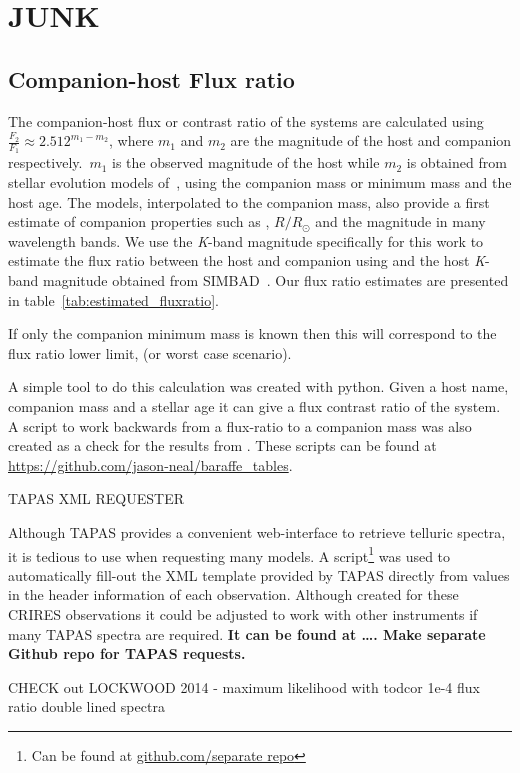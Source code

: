 

\section{JUNK}



\subsection{Companion-host Flux ratio}
The companion-host flux or contrast ratio of the systems are calculated using \(\frac{F_{2}}{F_{1}} \approx 2.512^{m_1-m_2}\), where \(m_1\) and \(m_2\) are the magnitude of the host and companion respectively.\ \(m_1\) is the observed magnitude of the host while \(m_2\) is obtained from stellar evolution models of~\citet{baraffe_evolutionary_2003, baraffe_new_2015}, using the companion mass or minimum mass and the host age. The models, interpolated to the companion mass, also provide a first estimate of companion properties such as \teff{}, \(R/R_{\odot}\) and the magnitude in many wavelength bands.
We use the \emph{K}-band magnitude specifically for this work to estimate the flux ratio between the host and companion using and the host \emph{K}-band magnitude obtained from {SIMBAD}~\citep{wenger_simbad_2000}. Our flux ratio estimates are presented in table~\ref{tab:estimated_fluxratio}.

If only the companion minimum mass is known then this will correspond to the flux ratio lower limit, (or worst case scenario).


A simple tool to do this calculation was created with python. Given a host name, companion mass and a stellar age it can give a flux contrast ratio of the system. A script to work backwards from a flux-ratio to a companion mass was also created as a check for the results from . These scripts can be found at \url{https://github.com/jason-neal/baraffe_tables}.




{TAPAS} XML REQUESTER

Although {TAPAS} provides a convenient web-interface to retrieve telluric spectra, it is tedious to use when requesting many models. A script\footnote{Can be found at \url{github.com/separate repo}} was used to automatically fill-out the XML template provided by {TAPAS} directly from values in the header information of each observation. Although created for these {CRIRES} observations it could be adjusted to work with other instruments if many {TAPAS} spectra are required. \textbf{It can be found at \ldots. Make separate Github repo for {TAPAS} requests.}






CHECK out LOCKWOOD 2014 - maximum likelihood with todcor 1e-4 flux ratio double lined spectra
